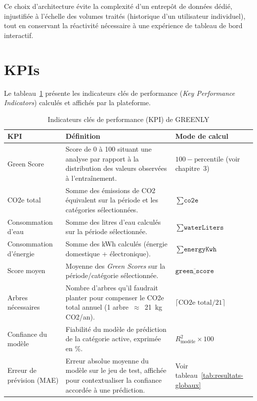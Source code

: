 Ce choix d'architecture évite la complexité d'un entrepôt de données dédié, injustifiée à l'échelle des volumes traités (historique d'un utilisateur individuel), tout en conservant la réactivité nécessaire à une expérience de tableau de bord interactif.

\section{KPIs}

Le tableau~\ref{tab:kpis} présente les indicateurs clés de performance (\textit{Key Performance Indicators}) calculés et affichés par la plateforme.

\begin{table}[H]
\centering
\caption{Indicateurs clés de performance (KPI) de GREENLY}
\label{tab:kpis}
\begin{tabular}{|p{3.4cm}|p{6.4cm}|p{3.5cm}|}
\hline
\rowcolor{isiBlue!15}
\textbf{KPI} & \textbf{Définition} & \textbf{Mode de calcul} \\
\hline
Green Score & Score de 0 à 100 situant une analyse par rapport à la distribution des valeurs observées à l'entraînement. & $100 - \text{percentile}$ (voir chapitre~3) \\ \hline
CO2e total & Somme des émissions de CO2 équivalent sur la période et les catégories sélectionnées. & $\sum \texttt{co2e}$ \\ \hline
Consommation d'eau & Somme des litres d'eau calculés sur la période sélectionnée. & $\sum \texttt{waterLiters}$ \\ \hline
Consommation d'énergie & Somme des kWh calculés (énergie domestique + électronique). & $\sum \texttt{energyKwh}$ \\ \hline
Score moyen & Moyenne des \textit{Green Scores} sur la période/catégorie sélectionnée. & $\overline{\texttt{green\_score}}$ \\ \hline
Arbres nécessaires & Nombre d'arbres qu'il faudrait planter pour compenser le CO2e total annuel (1 arbre~$\approx$~21~kg CO2/an). & $\lceil \text{CO2e total} / 21 \rceil$ \\ \hline
Confiance du modèle & Fiabilité du modèle de prédiction de la catégorie active, exprimée en \%. & $R^2_{\text{modèle}} \times 100$ \\ \hline
Erreur de prévision (MAE) & Erreur absolue moyenne du modèle sur le jeu de test, affichée pour contextualiser la confiance accordée à une prédiction. & Voir tableau~\ref{tab:resultats-globaux} \\ \hline
\end{tabular}
\end{table}

